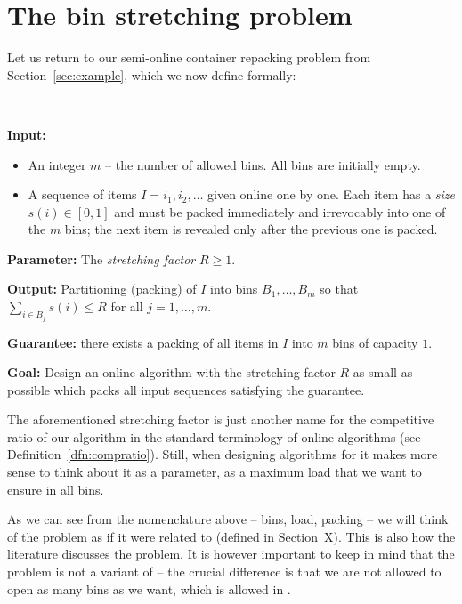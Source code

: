 \section{The bin stretching problem}\label{sec:binstretchdef}

Let us return to our semi-online container repacking problem from
Section~\ref{sec:example}, which we now define formally:

\begin{prb}[\binstretch]~

\noindent\textbf{Input:}

\begin{itemize}
\item An integer $m$ --  the number of allowed bins. All bins are initially empty.
\item A sequence of items $I=i_1, i_2, \ldots$ given online one by one. Each item has
a {\it size} $s(i) \in [0,1]$ and must be packed immediately and irrevocably into one of the $m$ bins; the next item
is revealed only after the previous one is packed.
\end{itemize}

\noindent\textbf{Parameter:} The {\it stretching factor} $R\geq 1$.

\noindent\textbf{Output:} Partitioning (packing) of $I$ into bins $B_1,\ldots,B_m$
so that $\sum_{i\in B_j}s(i)\leq R$ for all $j=1,\ldots,m$.

\noindent\textbf{Guarantee:} there exists a packing of all items in $I$ into $m$
bins of capacity $1$. 

\noindent\textbf{Goal:} Design an online algorithm with the stretching factor $R$
as small as possible which packs all input sequences satisfying the
guarantee.
\end{prb}
\medskip

The aforementioned stretching factor is just another name for the
competitive ratio of our algorithm in the standard terminology of
online algorithms (see Definition~\ref{dfn:compratio}). Still, when designing
algorithms for \binstretch it makes more sense to think about it as a
parameter, as a maximum load that we want to ensure in all bins.

As we can see from the nomenclature above -- bins, load, packing -- we
will think of the problem as if it were related to \binpacking
(defined in Section~X). This is also how the literature discusses the
problem.  It is however important to keep in mind that the problem is
not a variant of \binpacking -- the crucial difference is that we are
not allowed to open as many bins as we want, which is allowed in
\binpacking.


